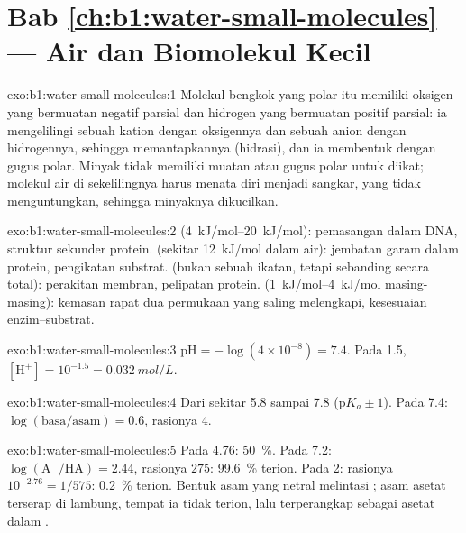 \section*{Bab \ref{ch:b1:water-small-molecules} --- Air dan Biomolekul Kecil}

\begin{solution}{exo:b1:water-small-molecules:1}
Molekul bengkok yang polar itu memiliki oksigen yang bermuatan negatif
parsial dan hidrogen yang bermuatan positif parsial: ia mengelilingi
sebuah kation dengan oksigennya dan sebuah anion dengan hidrogennya,
sehingga memantapkannya (hidrasi), dan ia membentuk 
dengan gugus polar. Minyak tidak memiliki muatan atau gugus polar untuk
diikat; molekul air di sekelilingnya harus menata diri menjadi sangkar,
yang tidak menguntungkan, sehingga minyaknya dikucilkan.
\end{solution}

\begin{solution}{exo:b1:water-small-molecules:2}
 (\qtyrange{4}{20}{kJ/mol}): pemasangan  dalam DNA,
struktur sekunder protein.  (sekitar \qty{12}{kJ/mol} dalam
air): jembatan garam dalam protein, pengikatan substrat. 
(bukan sebuah ikatan, tetapi sebanding secara total): perakitan
membran, pelipatan protein.  (\qtyrange{1}{4}{kJ/mol}
masing-masing): kemasan rapat dua permukaan yang saling melengkapi,
kesesuaian enzim--substrat.
\end{solution}

\begin{solution}{exo:b1:water-small-molecules:3}
$\mathrm{pH} = -\log(4\times 10^{-8}) = 7.4$. Pada  1.5,
$[\mathrm{H^+}] = 10^{-1.5} = \qty{0.032}{mol/L}$.
\end{solution}

\begin{solution}{exo:b1:water-small-molecules:4}
Dari sekitar 5.8 sampai 7.8 (p$K_a \pm 1$). Pada 7.4: $\log(\text{basa}/\text{asam})
= 0.6$, rasionya $4$.
\end{solution}

\begin{solution}{exo:b1:water-small-molecules:5}
Pada  4.76: \qty{50}{\%}. Pada 7.2: $\log(\mathrm{A^-}/\mathrm{HA}) =
2.44$, rasionya $275$: \qty{99.6}{\%} terion. Pada  2: rasionya $10^{-2.76} =
1/575$: \qty{0.2}{\%} terion. Bentuk asam yang netral melintasi ; asam asetat terserap di lambung, tempat ia tidak terion, lalu
terperangkap sebagai asetat dalam .
\end{solution}

